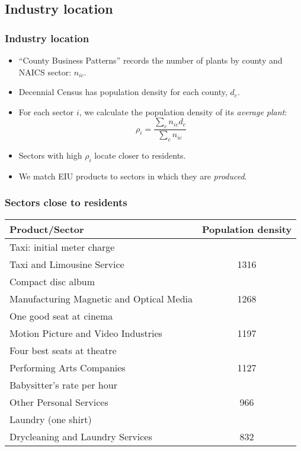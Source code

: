 \documentclass[compress,mathserif]{beamer}
\begin{document}
\subsection{Industry location}
\begin{frame}\frametitle{Industry location}
\begin{itemize}
\item ``County Business Patterns'' records the number of plants by county and NAICS sector: $n_{ic}$.
\item Decennial Census has population density for each county, $d_c$.
\item For each sector $i$, we calculate the population density of its \emph{average plant}:
\[
\rho_i = \frac{\sum_c n_{ic} d_c}{\sum_c n_{ic} }
\]
\item Sectors with high $\rho_i$ locate closer to residents.
\item We match EIU products to sectors in which they are \emph{produced}.
\end{itemize}
\end{frame}

\begin{frame}\frametitle{Sectors close to residents}
\begin{center}
\begin{tabular}{lc}
  \hline
  Product/Sector & Population density \\
  \hline
  Taxi: initial meter charge\\
  \hspace*{1em}Taxi and Limousine Service & 1316\\
  Compact disc album\\
  \hspace*{1em}Manufacturing Magnetic and Optical Media&1268\\
  One good seat at cinema\\
  \hspace*{1em}Motion Picture and Video Industries & 1197\\
  Four best seats at theatre\\
  \hspace*{1em}Performing Arts Companies & 1127\\
  Babysitter's rate per hour\\
  \hspace*{1em}Other Personal Services & 966\\
  Laundry (one shirt)\\
  \hspace*{1em}Drycleaning and Laundry Services & 832\\
  \hline
\end{tabular}
\end{center}
\end{frame}
\end{document}
